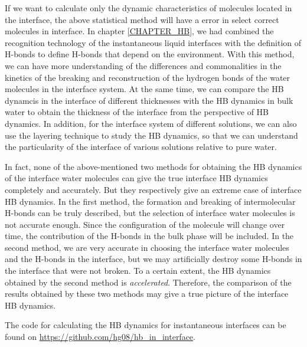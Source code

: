 If we want to calculate only the dynamic characteristics of molecules located in the interface, 
the above statistical method will have a error in select correct molecules in interface. 
In chapter \ref{CHAPTER_HB}, we had combined the recognition technology of the instantaneous liquid interfaces \cite{Willard2010} 
with the definition of H-bonds \cite{AL96b,Luzar1996} to define H-bonds that depend on the environment. 
With this method, we can have more understanding of the differences and commonalities in the kinetics of the breaking and reconstruction of the hydrogen bonds 
of the water molecules in the interface system. At the same time, we can compare the HB dynamcis in the interface of different thicknesses 
with the HB dynamics in bulk water to obtain the thickness of the interface from the perspective of HB dynamics. 
In addition, for the interface system of different solutions, we can also use the layering technique to study the HB dynamics,
so that we can understand the particularity of the interface of various solutions relative to pure water. 

In fact, none of the above-mentioned two methods for obtaining the HB dynamics of the interface water molecules 
can give the true interface HB dynamics completely and accurately. But they respectively give an extreme case of interface HB dynamics. 
In the first method, the formation and breaking of intermolecular H-bonds can be truly described, 
but the selection of interface water molecules is not accurate enough. Since the configuration of the molecule will change over time, 
the contribution of the H-bonds in the bulk phase will be included. 
In the second method, we are very accurate in choosing the interface water molecules and the H-bonds in the interface, 
but we may artificially destroy some H-bonds in the interface that were not broken. 
To a certain extent, the HB dynamics obtained by the second method is \emph{accelerated}. 
Therefore, the comparison of the results obtained by these two methods may give a true picture of the interface HB dynamics.

The code for calculating the HB dynamics for instantaneous interfaces can be found on \url{https://github.com/hg08/hb_in_interface}. 

